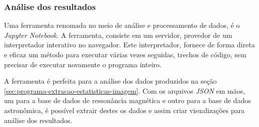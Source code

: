 \subsubsection{Análise dos resultados}

Uma ferramenta renomada no meio de análise e processamento de dados, é o \textit{Jupyter Notebook}. A ferramenta, consiste em um servidor, provedor de um interpretador interativo no navegador. Este interpretador, fornece de forma direta e eficaz um método para executar várias vezes seguidas, trechos de código, sem precisar de executar novamente o programa inteiro.

A ferramenta é perfeita para a análise dos dados produzidos na seção \ref{sec:programa-extracao-estatisticas-imagem}. Com os arquivos \textit{JSON} em mãos, um para a base de dados de ressonância magnética e outro para a base de dados astronômica, é possível extrair destes os dados e assim criar visualizações para análise dos resultados.


